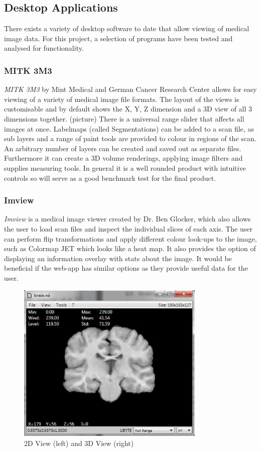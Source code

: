 \documentclass[a4paper,11pt,twoside]{article}
\begin{document}
\subsection{Desktop Applications}

There exists a variety of desktop software to date that allow viewing of medical image data. For this project, a selection of programs have been tested and analysed for functionality.

\subsubsection{MITK 3M3}
\textit{MITK 3M3} by Mint Medical and German Cancer Research Center allows for easy viewing of a variety of medical image file formats. The layout of the views is customisable and by default shows the X, Y, Z dimension and a 3D view of all 3 dimensions together. (picture) There is a universal range slider that affects all images at once. Labelmaps (called Segmentations) can be added to a scan file, as sub layers and a range of paint tools are provided to colour in regions of the scan. An arbitrary number of layers can be created and saved out as separate files. 
Furthermore it can create a 3D volume renderings, applying image filters and supplies measuring tools. In general it is a well rounded product with intuitive controls so will serve as a good benchmark test for the final product.

\subsubsection{Imview}
\textit{Imview} is a medical image viewer created by Dr. Ben Glocker, which also allows the user to load scan files and inspect the individual slices of each axis. The user can perform flip transformations and apply different colour look-ups to the image, such as Colormap JET which looks like a heat map. It also provides the option of displaying an information overlay with stats about the image. It would be beneficial if the web-app has similar options as they provide useful data for the user.


\begin{figure}[ht!]
\centering
\includegraphics[width=90mm]{..//literatureSurvey/graphics/imview_01.png}
\caption{2D View (left) and 3D View (right)}
\label{fig:UIdesign1}
\end{figure}
\end{document}
